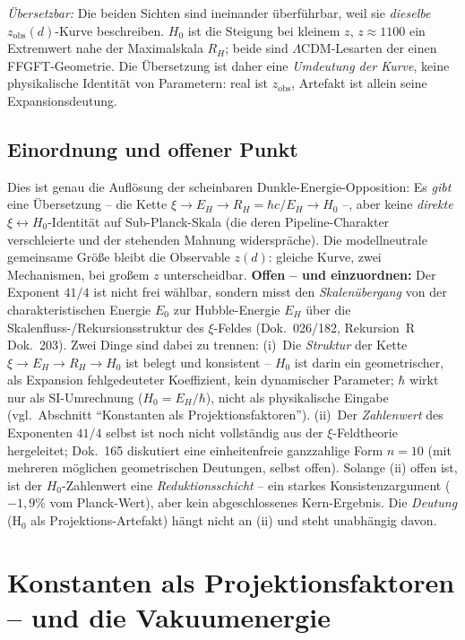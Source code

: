 \emph{Übersetzbar:} Die beiden Sichten sind ineinander überführbar, weil sie
\emph{dieselbe} $z_{\text{obs}}(d)$-Kurve beschreiben. $H_0$ ist die Steigung
bei kleinem $z$, $z\approx 1100$ ein Extremwert nahe der Maximalskala $R_H$;
beide sind $\Lambda$CDM-Lesarten der einen FFGFT-Geometrie. Die Übersetzung
ist daher eine \emph{Umdeutung der Kurve}, keine physikalische Identität von
Parametern: real ist $z_{\text{obs}}$, Artefakt ist allein seine
Expansionsdeutung.

\subsection*{Einordnung und offener Punkt}

Dies ist genau die Auflösung der scheinbaren Dunkle-Energie-Opposition: Es
\emph{gibt} eine Übersetzung -- die Kette $\xi \to E_H \to R_H = \hbar c/E_H
\to H_0$ --, aber keine \emph{direkte} $\xi \leftrightarrow H_0$-Identität auf
Sub-Planck-Skala (die deren Pipeline-Charakter verschleierte und der stehenden
Mahnung widerspräche). Die modellneutrale gemeinsame Größe bleibt die
Observable $z(d)$: gleiche Kurve, zwei Mechanismen, bei großem $z$
unterscheidbar. \textbf{Offen -- und einzuordnen:} Der Exponent $41/4$ ist
nicht frei wählbar, sondern misst den \emph{Skalenübergang} von der
charakteristischen Energie $E_0$ zur Hubble-Energie $E_H$ über die
Skalenfluss-/Rekursionsstruktur des $\xi$-Feldes (Dok.~026/182, Rekursion~R
Dok.~203). Zwei Dinge sind dabei zu trennen: (i)~Die \emph{Struktur} der Kette
$\xi\to E_H\to R_H\to H_0$ ist belegt und konsistent -- $H_0$ ist darin ein
geometrischer, als Expansion fehlgedeuteter Koeffizient, kein dynamischer
Parameter; $\hbar$ wirkt nur als SI-Umrechnung ($H_0=E_H/\hbar$), nicht als
physikalische Eingabe (vgl.\ Abschnitt \enquote{Konstanten als
Projektionsfaktoren}). (ii)~Der \emph{Zahlenwert} des Exponenten $41/4$ selbst
ist noch nicht vollständig aus der $\xi$-Feldtheorie hergeleitet; Dok.~165
diskutiert eine einheitenfreie ganzzahlige Form $n=10$ (mit mehreren möglichen
geometrischen Deutungen, selbst offen). Solange (ii) offen ist, ist der
$H_0$-Zahlenwert eine \emph{Reduktionsschicht} -- ein starkes
Konsistenzargument ($-1{,}9\%$ vom Planck-Wert), aber kein abgeschlossenes
Kern-Ergebnis. Die \emph{Deutung} (H$_0$ als Projektions-Artefakt) hängt nicht
an (ii) und steht unabhängig davon.

\section{Konstanten als Projektionsfaktoren -- und die Vakuumenergie}

